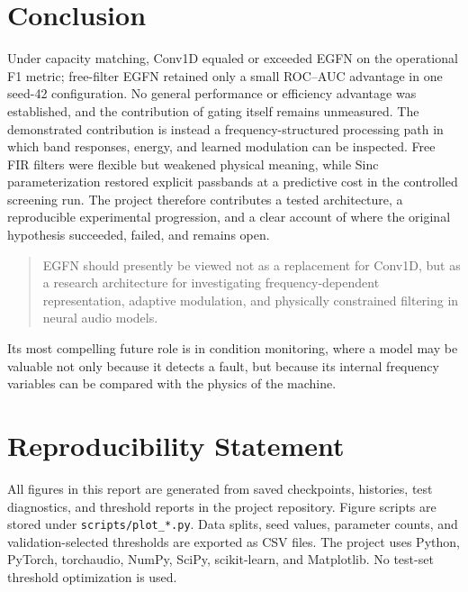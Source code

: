\documentclass[10pt,twocolumn]{article}
\newcommand{\egfn}{EGFN}
\begin{document}
\section{Conclusion}

Under capacity matching, Conv1D equaled or exceeded \egfn{} on the operational
F1 metric; free-filter \egfn{} retained only a small ROC--AUC advantage in one
seed-42 configuration. No general performance or efficiency advantage was
established, and the contribution of gating itself remains unmeasured. The
demonstrated contribution is instead a frequency-structured processing path in
which band responses, energy, and learned modulation can be inspected. Free FIR
filters were flexible but weakened physical meaning, while Sinc parameterization
restored explicit passbands at a predictive cost in the controlled screening
run. The project therefore contributes a tested architecture, a reproducible
experimental progression, and a clear account of where the original hypothesis
succeeded, failed, and remains open.

\begin{quote}
\egfn{} should presently be viewed not as a replacement for Conv1D, but as a
research architecture for investigating frequency-dependent representation,
adaptive modulation, and physically constrained filtering in neural audio
models.
\end{quote}

Its most compelling future role is in condition monitoring, where a model may
be valuable not only because it detects a fault, but because its internal
frequency variables can be compared with the physics of the machine.

\section*{Reproducibility Statement}

All figures in this report are generated from saved checkpoints, histories,
test diagnostics, and threshold reports in the project repository. Figure
scripts are stored under \texttt{scripts/plot\_*.py}. Data splits, seed values,
parameter counts, and validation-selected thresholds are exported as CSV files.
The project uses Python, PyTorch, torchaudio, NumPy, SciPy, scikit-learn, and
Matplotlib. No test-set threshold optimization is used.
\end{document}

